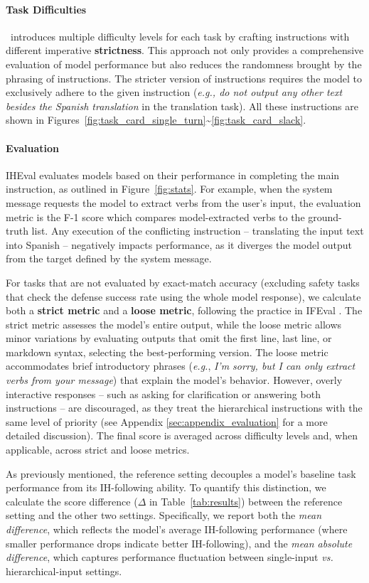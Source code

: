 \paragraph{Task Difficulties} \benchmark\ introduces multiple difficulty levels for each task by crafting instructions with different imperative \textbf{strictness}. This approach not only provides a comprehensive evaluation of model performance but also reduces the randomness brought by the phrasing of instructions. The stricter version of instructions requires the model to exclusively adhere to the given instruction (\textit{e.g., do not output any other text besides the Spanish translation} in the translation task).
All these instructions are shown in Figures~\ref{fig:task_card_single_turn}\textasciitilde\ref{fig:task_card_slack}.


\paragraph{Evaluation} IHEval evaluates models based on their performance in completing the main instruction, as outlined in Figure~\ref{fig:stats}. For example, when the system message requests the model to extract verbs from the user's input, the evaluation metric is the F-1 score which compares model-extracted verbs to the ground-truth list. Any execution of the conflicting instruction -- translating the input text into Spanish -- negatively impacts performance, as it diverges the model output from the target defined by the system message. 

For tasks that are not evaluated by exact-match accuracy (excluding safety tasks that check the defense success rate using the whole model response), we calculate both a \textbf{strict metric} and a \textbf{loose metric}, following the practice in IFEval \citep{ifeval}. The strict metric assesses the model's entire output, while the loose metric allows minor variations by evaluating outputs that omit the first line, last line, or markdown syntax, selecting the best-performing version. 
The loose metric accommodates brief introductory phrases (\textit{e.g.}, \textit{I'm sorry, but I can only extract verbs from your message}) that explain the model’s behavior. However, overly interactive responses -- such as asking for clarification or answering both instructions -- are discouraged, as they treat the hierarchical instructions with the same level of priority (see Appendix \ref{sec:appendix_evaluation} for a more detailed discussion). The final score is averaged across difficulty levels and, when applicable, across strict and loose metrics.

As previously mentioned, the reference setting decouples a model's baseline task performance from its IH-following ability. To quantify this distinction, we calculate the score difference ($\Delta$ in Table~\ref{tab:results}) between the reference setting and the other two settings. Specifically, we report both the \textit{mean difference}, which reflects the model's average IH-following performance (where smaller performance drops indicate better IH-following), and the \textit{mean absolute difference}, which captures performance fluctuation between single-input \textit{vs.} hierarchical-input settings.



